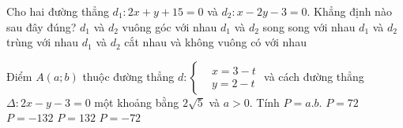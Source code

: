 \begin{ex}%
	Cho hai đường thẳng $d_1:2x+y+15=0$ và $d_2:x-2y-3=0$. Khẳng định nào sau đây đúng?
	\choice
	{\True $d_1$ và $d_2$ vuông góc với nhau}
	{$d_1$ và $d_2$ song song với nhau}
	{$d_1$ và $d_2$ trùng với nhau}
	{$d_1$ và $d_2$ cắt nhau và không vuông có với nhau}
\end{ex}
\begin{ex}%
	Điểm $A(a;b)$ thuộc đường thẳng $d:\left\{\begin{aligned} &x=3-t\\&y=2-t\end{aligned}\right.$ và cách đường thẳng $\Delta:2x-y-3=0$ một khoảng bằng $2\sqrt{5}$ và $a>0$. Tính $P=a.b$.
	\choice
	{$P=72$}
	{$P=-132$}
	{\True $P=132$}
	{$P=-72$}
	\loigiai{
	Ta có $A\in d\Rightarrow \left\{ \begin{aligned}&a=3-t\\&b=2-t\end{aligned}\right.\Rightarrow A(3-t;2-t)$.\\
	Mà \begin{align*}
		&d\left(A,\Delta\right)=2\sqrt{5}\\
		&\Leftrightarrow \dfrac{|2(3-t)-(2-t)-3|}{\sqrt{2^2+(-1)^2}}=2\sqrt{5}\\
		&\Leftrightarrow |-t+1|=10\\
		&\Leftrightarrow \left[\begin{aligned}&-t+1=10\\&-t+1=-10\end{aligned}\right.\\
		&\Leftrightarrow \left[\begin{aligned}&t=-9\\&t=11\end{aligned}\right.
	\end{align*}
	Với $t=-9\Rightarrow a=3-(-9)=12>0\Rightarrow b=2-(-9)=11\Rightarrow P=11\cdot 12=132.$\\
	Với $t=11\Rightarrow a=3-11=-8<0$ loại.
}
\end{ex}

